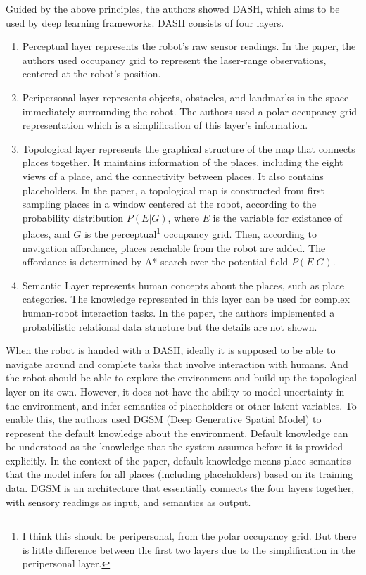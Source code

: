 \documentclass[10pt, titlepage]{article}
\theoremstyle{definition}
\begin{document}
\noindent Guided by the above principles, the authors showed DASH, which aims to be used by deep learning frameworks. DASH consists of four layers.
\begin{enumerate}[label=(\arabic*)]
    \item Perceptual layer represents the robot's raw sensor readings. In the paper, the authors used occupancy grid to represent the laser-range observations, centered at the robot's position.
    \item Peripersonal layer represents objects, obstacles, and landmarks in the space immediately surrounding the robot. The authors used a polar occupancy grid representation which is a simplification of this layer's information.
    \item Topological layer represents the graphical structure of the map that connects places together. It maintains information of the places, including the eight views of a place, and the connectivity between places. It also contains placeholders. In the paper, a topological map is constructed from first sampling places in a window centered at the robot, according to the probability distribution $P(E|G)$, where $E$ is the variable for existance of places, and $G$ is the perceptual\footnote{I think this should be peripersonal, from the polar occupancy grid. But there is little difference between the first two layers due to the simplification in the peripersonal layer.} occupancy grid. Then, according to navigation affordance, places reachable from the robot are added. The affordance is determined by A* search over the potential field $P(E|G)$. 
    \item Semantic Layer represents human concepts about the places, such as place categories. The knowledge represented in this layer can be used for complex human-robot interaction tasks. In the paper, the authors implemented a probabilistic relational data structure but the details are not shown.
\end{enumerate}
When the robot is handed with a DASH, ideally it is supposed to be able to navigate around and complete tasks that involve interaction with humans. And the robot should be able to explore the environment and build up the topological layer on its own. However, it does not have the ability to model uncertainty in the environment, and infer semantics of placeholders or other latent variables. To enable this, the authors used DGSM (Deep Generative Spatial Model) \cite{pronobis2016learning} to represent the default knowledge about the environment. Default knowledge can be understood as the knowledge that the system assumes before it is provided explicitly. In the context of the paper, default knowledge means place semantics that the model infers for all places (including placeholders) based on its training data. DGSM is an architecture that essentially connects the four layers together, with sensory readings as input, and semantics as output. 
\end{document}
